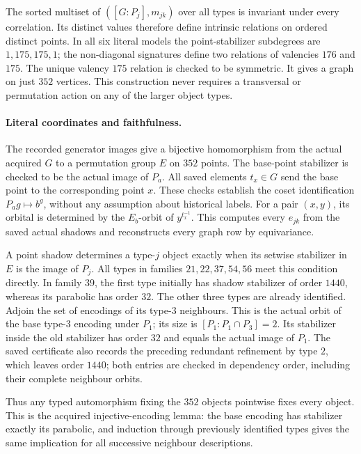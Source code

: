 \documentclass[11pt]{article}
\begin{document}
The sorted multiset of $([G:P_j],m_{jk})$ over all types is invariant
under every correlation. Its distinct values therefore define intrinsic
relations on ordered distinct points. In all six literal models the
point-stabilizer subdegrees are $1,175,175,1$; the non-diagonal signatures
define two relations of valencies $176$ and $175$. The unique valency
$175$ relation is checked to be symmetric. It gives a graph on just
$352$ vertices. This construction never requires a transversal or
permutation action on any of the larger object types.

\paragraph{Literal coordinates and faithfulness.}
The recorded generator images give a bijective homomorphism from the
actual acquired $G$ to a permutation group $E$ on $352$ points.
The base-point stabilizer is checked to be the actual image of $P_a$.
All saved elements $t_x\in G$ send the base point to the corresponding
point $x$. These checks establish the coset identification
$P_ag\mapsto b^g$, without any assumption about historical labels.
For a pair $(x,y)$, its orbital is determined by the $E_b$-orbit of
$y^{t_x^{-1}}$. This computes every $e_{jk}$ from the saved actual
shadows and reconstructs every graph row by equivariance.

A point shadow determines a type-$j$ object exactly when its setwise
stabilizer in $E$ is the image of $P_j$. All types in families
$21,22,37,54,56$ meet this condition directly. In family $39$, the first
type initially has shadow stabilizer of order $1440$, whereas its
parabolic has order $32$. The other three types are already identified.
Adjoin the set of encodings of its type-$3$ neighbours. This is the
actual orbit of the base type-$3$ encoding under $P_1$; its size is
$[P_1:P_1\cap P_3]=2$. Its stabilizer inside the old stabilizer has
order $32$ and equals the actual image of $P_1$.
The saved certificate also records the preceding redundant refinement
by type $2$, which leaves order $1440$; both entries are checked in
dependency order, including their complete neighbour orbits.

Thus any typed automorphism fixing the $352$ objects pointwise fixes
every object. This is the acquired injective-encoding lemma: the
base encoding has stabilizer exactly its parabolic, and induction
through previously identified types gives the same implication for
all successive neighbour descriptions.
\end{document}
